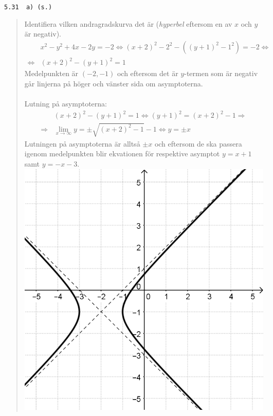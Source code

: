 \documentclass[a4paper]{article}
\newcommand{\tskcol}[1]{\textcolor{tskcol}{#1}}
\begin{document}
	\texttt{\tskcol{5.31~~a) (s.)}}
	\begin{quotation}
		\noindent
		Identifiera vilken andragradskurva det är (\emph{hyperbel} eftersom en av $x$ och $y$ är negativ).
		\begin{align*}
		&x^2-y^2+4x-2y=-2 \Leftrightarrow
		(x+2)^2-2^2-((y+1)^2-1^2)=-2 \Leftrightarrow \\ \Leftrightarrow
		&(x+2)^2-(y+1)^2=1
		\end{align*}
		Medelpunkten är $(-2,-1)$ och eftersom det är $y$-termen som är negativ går linjerna på höger och vänster sida om asymptoterna.
		\\ \\ 
		Lutning på asymptoterna:
		\begin{align*}
		&(x+2)^2-(y+1)^2=1 \Leftrightarrow
		(y+1)^2=(x+2)^2-1 \Rightarrow \\ \Rightarrow
		&\lim_{x\rightarrow\infty}y=\pm\sqrt{(x+2)^2-1}-1 \Leftrightarrow
		y=\pm x
		\end{align*}
		Lutningen på asymptoterna är alltså $\pm x$ och eftersom de ska passera igenom medelpunkten blir ekvationen för respektive asymptot $y=x+1$ samt $y=-x-3$. \\
		\includegraphics[scale=0.2]{images/531a.png}
	\end{quotation}
	
\end{document}

